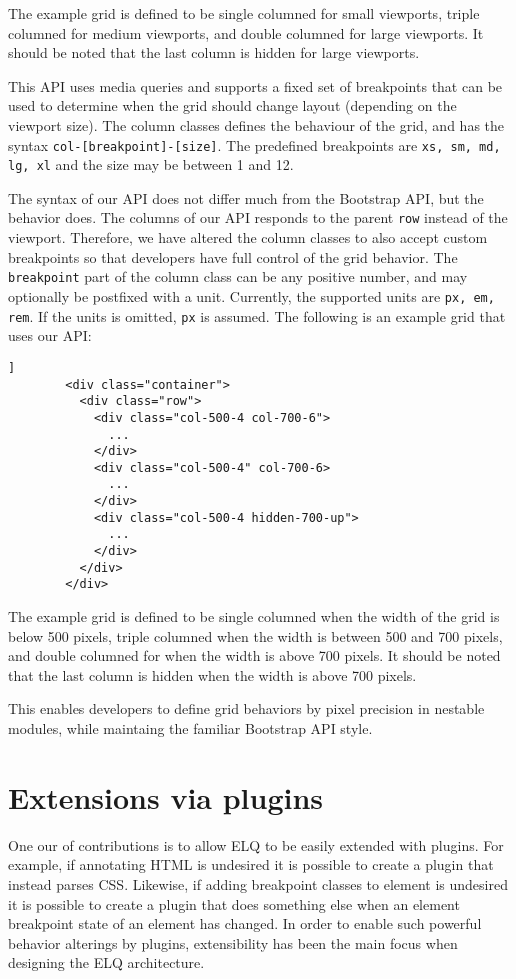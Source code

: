 \documentclass{acm_proc_article-sp}
\newcommand{\code}[1]{\texttt{#1}}
\newcommand{\elq}{ELQ}
\begin{document}
      The example grid is defined to be single columned for small viewports, triple columned for medium viewports, and double columned for large viewports.
      It should be noted that the last column is hidden for large viewports.
      
      This API uses media queries and supports a fixed set of breakpoints that can be used to determine when the grid should change layout (depending on the viewport size).
      The column classes defines the behaviour of the grid, and has the syntax \code{col-[breakpoint]-[size]}.
      The predefined breakpoints are \code{xs, sm, md, lg, xl} and the size may be between 1 and 12.

      The syntax of our API does not differ much from the Bootstrap API, but the behavior does.
      The columns of our API responds to the parent \code{row} instead of the viewport.
      Therefore, we have altered the column classes to also accept custom breakpoints so that developers have full control of the grid behavior.
      The \code{breakpoint} part of the column class can be any positive number, and may optionally be postfixed with a unit.
      Currently, the supported units are \code{px, em, rem}.
      If the units is omitted, \code{px} is assumed.
      The following is an example grid that uses our API:

      \begin{lstlisting}[gobble=8,caption={},captionpos=b,label={}]]
        <div class="container">
          <div class="row">
            <div class="col-500-4 col-700-6">
              ...
            </div>
            <div class="col-500-4" col-700-6>
              ...
            </div>
            <div class="col-500-4 hidden-700-up">
              ...
            </div>
          </div>
        </div>
      \end{lstlisting}

      The example grid is defined to be single columned when the width of the grid is below 500 pixels, triple columned when the width is between 500 and 700 pixels, and double columned for when the width is above 700 pixels.
      It should be noted that the last column is hidden when the width is above 700 pixels.

      This enables developers to define grid behaviors by pixel precision in nestable modules, while maintaing the familiar Bootstrap API style.

\section{Extensions via plugins}
  One our of contributions is to allow \elq{} to be easily extended with plugins.
  For example, if annotating HTML is undesired it is possible to create a plugin that instead parses CSS.
  Likewise, if adding breakpoint classes to element is undesired it is possible to create a plugin that does something else when an element breakpoint state of an element has changed.
  In order to enable such powerful behavior alterings by plugins, extensibility has been the main focus when designing the \elq{} architecture.
\end{document}
